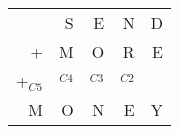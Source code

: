 \begin{tabular}{rrrrr}
  & S & E & N & D \\
+ & M & O & R & E \\
+$_{C5}$&$_{C4}$ &$_{C3}$&$_{C2}$&  \\ \hline
M & O & N & E & Y
\end{tabular}
